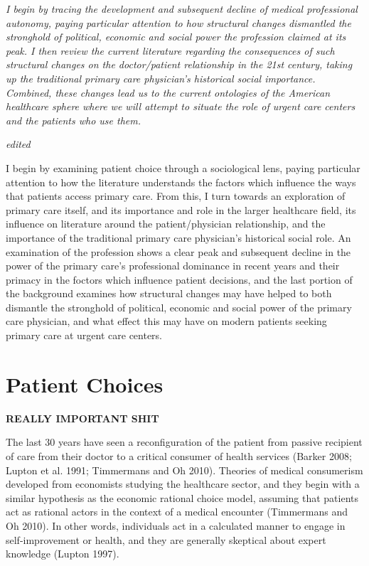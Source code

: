 \documentclass[12pt,twoside]{reedthesis}
\begin{document}
  \emph{I begin by tracing the development and subsequent decline of
  medical professional autonomy, paying particular attention to how
  structural changes dismantled the stronghold of political, economic and
  social power the profession claimed at its peak. I then review the
  current literature regarding the consequences of such structural changes
  on the doctor/patient relationship in the 21st century, taking up the
  traditional primary care physician's historical social importance.
  Combined, these changes lead us to the current ontologies of the
  American healthcare sphere where we will attempt to situate the role of
  urgent care centers and the patients who use them.}
  
  \emph{edited}
  
  I begin by examining patient choice through a sociological lens, paying
  particular attention to how the literature understands the factors which
  influence the ways that patients access primary care. From this, I turn
  towards an exploration of primary care itself, and its importance and
  role in the larger healthcare field, its influence on literature around
  the patient/physician relationship, and the importance of the
  traditional primary care physician's historical social role. An
  examination of the profession shows a clear peak and subsequent decline
  in the power of the primary care's professional dominance in recent
  years and their primacy in the foctors which influence patient
  decisions, and the last portion of the background examines how
  structural changes may have helped to both dismantle the stronghold of
  political, economic and social power of the primary care physician, and
  what effect this may have on modern patients seeking primary care at
  urgent care centers.
  
  \section*{Patient Choices}\label{patient-choices}
  
  \textbf{REALLY IMPORTANT SHIT}
  
  The last 30 years have seen a reconfiguration of the patient from
  passive recipient of care from their doctor to a critical consumer of
  health services (Barker 2008; Lupton et al. 1991; Timmermans and Oh
  2010). Theories of medical consumerism developed from economists
  studying the healthcare sector, and they begin with a similar hypothesis
  as the economic rational choice model, assuming that patients act as
  rational actors in the context of a medical encounter (Timmermans and Oh
  2010). In other words, individuals act in a calculated manner to engage
  in self-improvement or health, and they are generally skeptical about
  expert knowledge (Lupton 1997).
  
\end{document}
